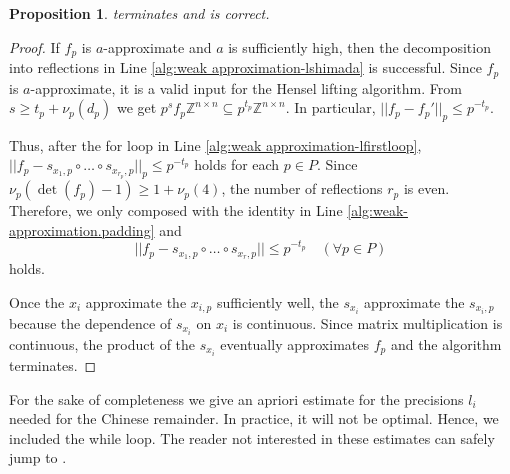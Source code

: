\documentclass[11pt,letterpaper]{amsart}
\newcommand{\ZZ}{\mathbb{Z}}
\newtheorem{proposition}[theorem]{Proposition}
\theoremstyle{definition}
\theoremstyle{remark}
\begin{document}
\begin{proposition}
 terminates and is correct. 
\end{proposition}
\begin{proof}
If $f_p$ is $a$-approximate and $a$ is sufficiently high, then the decomposition into reflections in Line \ref{alg:weak approximation-lshimada} is successful. 
Since $f_p$ is $a$-approximate, it is a valid input for the Hensel lifting algorithm.
From $s \geq t_p + \nu_p(d_p)$ we get $p^sf_p \ZZ^{n \times n} \subseteq p^{t_p}\ZZ^{n\times n}$. In particular, $||f_p-f_p'||_p \leq p^{-t_p}$.   

Thus, after the for loop in Line \ref{alg:weak approximation-lfirstloop}, $||f_p - s_{x_1,p} \circ \dots \circ s_{x_{r_p},p}||_p\leq p^{-t_p}$ holds for each $p \in P$.  
Since $\nu_p(\det(f_p)-1)\geq 1 + \nu_p(4)$, the number of reflections $r_p$ is even. Therefore, we only composed with the identity in Line \ref{alg:weak-approximation.padding} and 
\[||f_p - s_{x_1,p} \circ \dots \circ s_{x_{r},p}||\leq p^{-t_p} \quad (\forall p \in P)\]
holds. 

Once the $x_i$ approximate the $x_{i,p}$ sufficiently well, the $s_{x_i}$ approximate the $s_{x_i,p}$ because the dependence of $s_{x_i}$ on $x_i$ is continuous. Since matrix multiplication is continuous, the product of the $s_{x_i}$ eventually approximates $f_p$ and the algorithm terminates. 
\end{proof}

For the sake of completeness we give an apriori estimate for the precisions $l_i$ needed for the Chinese remainder. In practice, it will not be optimal. Hence, we included the while loop. The reader not interested in these estimates can safely jump to .
\end{document}
